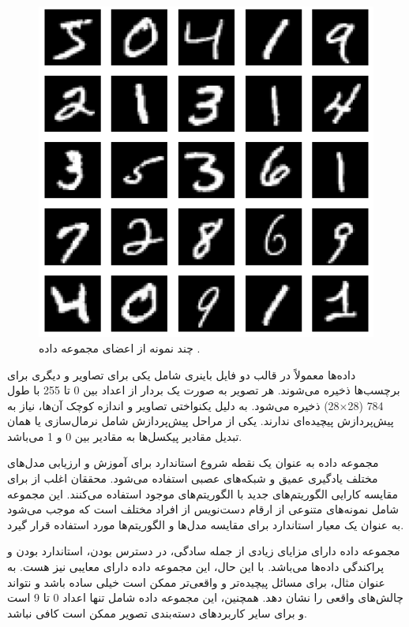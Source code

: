 \begin{figure}[t]
	\centering
	\includegraphics[scale=0.5]{images/chap5/mnist.png}%
	\caption{%
		چند نمونه از اعضای مجموعه داده
		\cite{holzer2023dynamically}.
	}
	\label{mnist}
	\centering
\end{figure}


داده‌ها معمولاً در قالب دو فایل باینری شامل یکی برای تصاویر و دیگری برای برچسب‌ها ذخیره می‌شوند. هر تصویر به صورت یک بردار از اعداد بین 0 تا 255 با طول 784
(28$\times$28)
ذخیره می‌شود. به دلیل یکنواختی تصاویر و اندازه کوچک آن‌ها، نیاز به پیش‌پردازش پیچیده‌ای ندارند. یکی از مراحل پیش‌پردازش شامل نرمال‌سازی یا همان تبدیل مقادیر پیکسل‌ها به مقادیر بین 0 و 1 می‌باشد.

مجموعه داده
به عنوان یک نقطه شروع استاندارد برای آموزش و ارزیابی مدل‌های مختلف یادگیری عمیق و شبکه‌های عصبی استفاده می‌شود. محققان اغلب از
برای مقایسه کارایی الگوریتم‌های جدید با الگوریتم‌های موجود استفاده می‌کنند. این مجموعه شامل نمونه‌های متنوعی از ارقام دست‌نویس از افراد مختلف است که موجب می‌شود به عنوان یک معیار استاندارد برای مقایسه مدل‌ها و الگوریتم‌ها مورد استفاده قرار گیرد.

مجموعه داده
دارای مزایای زیادی از جمله سادگی، در دسترس بودن، استاندارد بودن و پراکندگی داده‌ها می‌باشد. با این حال، این مجموعه داده دارای معایبی نیز هست. به عنوان مثال، برای مسائل پیچیده‌تر و واقعی‌تر ممکن است
خیلی ساده باشد و نتواند چالش‌های واقعی را نشان دهد. همچنین، این مجموعه داده شامل تنها اعداد 0 تا 9 است و برای سایر کاربردهای دسته‌بندی تصویر ممکن است کافی نباشد.

